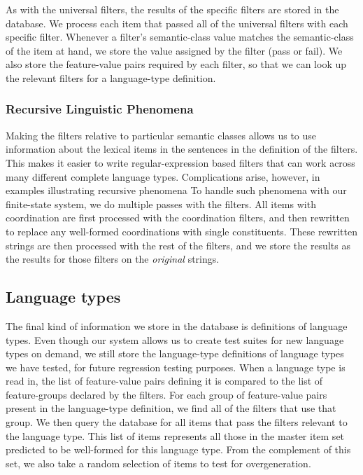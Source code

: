 \documentclass[11pt]{article}
\begin{document}
As with the universal filters, the results of the specific filters are
stored in the database.  We process each item that passed all of the
universal filters with each specific filter.  Whenever a filter's
semantic-class value matches the semantic-class of the item at hand,
we store the value assigned by the filter (pass or fail).  We also
store the feature-value pairs required by each filter, so that we can
look up the relevant filters for a language-type definition.


\subsubsection{Recursive Linguistic Phenomena}

Making the filters relative to particular semantic classes
allows us to use information about the lexical items in 
the sentences in the definition of the filters.  This makes
it easier to write regular-expression based filters that
can work across many different complete language types. 
Complications arise, however, in examples illustrating recursive phenomena
To handle such phenomena with our finite-state system, we do multiple
passes with the filters.  All items with coordination are first processed
with the coordination filters, and then rewritten to replace any
well-formed coordinations with single constituents.  These rewritten
strings are then processed with the rest of the filters, and we store
the results as the results for those filters on the {\it original}
strings.

\subsection{Language types}

The final kind of information we store in the database is definitions
of language types.  Even though our system allows us to create test
suites for new language types on demand, we still store the
language-type definitions of language types we have tested, for future
regression testing purposes.  When a language type is read in, the
list of feature-value pairs defining it is compared to the list of
feature-groups declared by the filters.  For each group of
feature-value pairs present in the language-type definition, we find
all of the filters that use that group.  We then query the database
for all items that pass the filters relevant to the language type.
This list of items represents all those in the master item set
predicted to be well-formed for this language type.  From the
complement of this set, we also take a random selection of items to
test for overgeneration.
\end{document}
